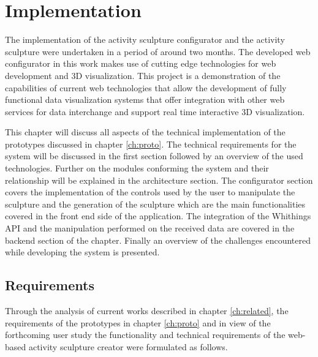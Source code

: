 \documentclass[../medieninformatik-arbeit.tex]{subfiles}
\begin{document}
\section{Implementation}
\label{ch:configurator}
The implementation of the activity sculpture configurator and the activity sculpture were undertaken in a period of around two months. The developed web configurator in this work makes use of cutting edge technologies for web development and 3D visualization. This project is a demonstration of the capabilities of current web technologies that allow the development of fully functional data visualization systems that offer integration with other web services for data interchange and support real time interactive 3D visualization.

This chapter will discuss all aspects of the technical implementation of the prototypes discussed in chapter \ref{ch:proto}. The technical requirements for the system will be discussed in the first section followed by an overview of the used technologies. Further on the modules conforming the system and their relationship will be explained in the architecture section. The configurator section covers the implementation of the controls used by the user to manipulate the sculpture and the generation of the sculpture which are the main functionalities covered in the front end side of the application. The integration of the Whithings API and the manipulation performed on the received data are covered in the backend section of the chapter. Finally an overview of the challenges encountered while developing the system is presented. 

\subsection{Requirements}
Through the analysis of current works described in chapter \ref{ch:related}, the requirements of the prototypes in chapter \ref{ch:proto} and in view of the forthcoming user study the functionality and technical requirements of the web-based activity sculpture creator were formulated as follows.
\end{document}
